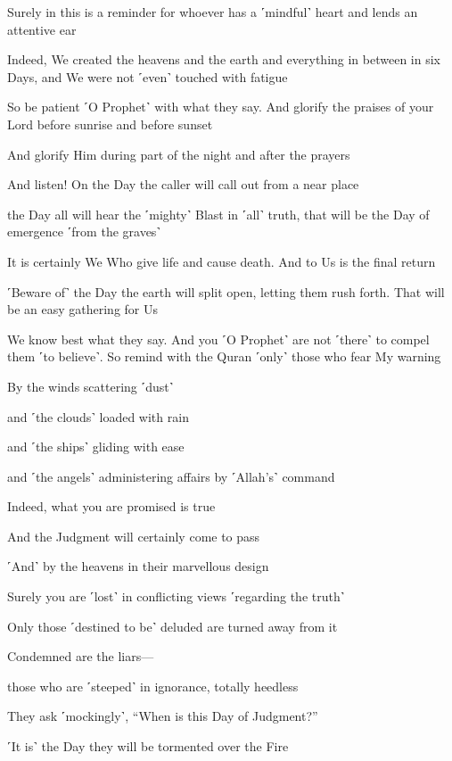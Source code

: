 Surely in this is a reminder for whoever has a ˹mindful˺ heart and lends an attentive ear

Indeed, We created the heavens and the earth and everything in between in six Days, and We were not ˹even˺ touched with fatigue

So be patient ˹O Prophet˺ with what they say. And glorify the praises of your Lord before sunrise and before sunset

And glorify Him during part of the night and after the prayers

And listen! On the Day the caller will call out from a near place

the Day all will hear the ˹mighty˺ Blast in ˹all˺ truth, that will be the Day of emergence ˹from the graves˺

It is certainly We Who give life and cause death. And to Us is the final return

˹Beware of˺ the Day the earth will split open, letting them rush forth. That will be an easy gathering for Us

We know best what they say. And you ˹O Prophet˺ are not ˹there˺ to compel them ˹to believe˺. So remind with the Quran ˹only˺ those who fear My warning

By the winds scattering ˹dust˺

and ˹the clouds˺ loaded with rain

and ˹the ships˺ gliding with ease

and ˹the angels˺ administering affairs by ˹Allah’s˺ command

Indeed, what you are promised is true

And the Judgment will certainly come to pass

˹And˺ by the heavens in their marvellous design

Surely you are ˹lost˺ in conflicting views ˹regarding the truth˺

Only those ˹destined to be˺ deluded are turned away from it

Condemned are the liars—

those who are ˹steeped˺ in ignorance, totally heedless

They ask ˹mockingly˺, “When is this Day of Judgment?”

˹It is˺ the Day they will be tormented over the Fire

